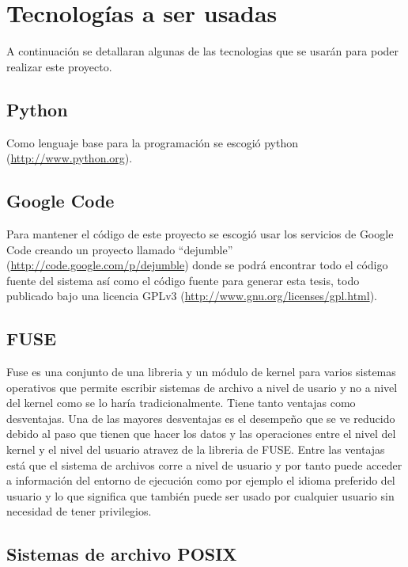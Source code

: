 \section{Tecnologías a ser usadas}

A continuación se detallaran algunas de las tecnologias que se usarán para poder realizar este proyecto.

\subsection{Python}

Como lenguaje base para la programación se escogió python (\url{http://www.python.org}).

\subsection{Google Code}

Para mantener el código de este proyecto se escogió usar los servicios de Google Code creando un proyecto llamado ``dejumble'' (\url{http://code.google.com/p/dejumble}) donde se podrá encontrar todo el código fuente del sistema así como el código fuente para generar esta tesis, todo publicado bajo una licencia GPLv3 (\url{http://www.gnu.org/licenses/gpl.html}).

\subsection{FUSE}

Fuse es una conjunto de una libreria y un módulo de kernel para varios sistemas operativos que permite escribir sistemas de archivo a nivel de usario y no a nivel del kernel como se lo haría tradicionalmente. Tiene tanto ventajas como desventajas. Una de las mayores desventajas es el desempeño que se ve reducido debido al paso que tienen que hacer los datos y las operaciones entre el nivel del kernel y el nivel del usuario atravez de la libreria de FUSE. Entre las ventajas está que el sistema de archivos corre a nivel de usuario y por tanto puede acceder a información del entorno de ejecución como por ejemplo el idioma preferido del usuario y lo que significa que también puede ser usado por cualquier usuario sin necesidad de tener privilegios.

\subsection{Sistemas de archivo POSIX}

